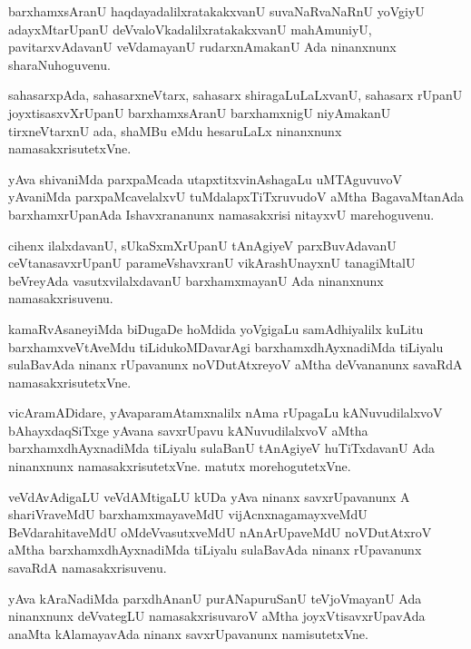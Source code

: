 \documentclass{article}
\begin{document}
\begin{mn}
barxhamxsAranU haqdayadalilxratakakxvanU suvaNaRvaNaRnU yoVgiyU adayxMtarUpanU 
deVvaloVkadalilxratakakxvanU mahAmuniyU, pavitarxvAdavanU veVdamayanU rudarxnAmakanU Ada 
ninanxnunx sharaNuhoguvenu.
\end{mn}

\begin{mn}
sahasarxpAda, sahasarxneVtarx, sahasarx shiragaLuLaLxvanU, sahasarx rUpanU joyxtisasxvXrUpanU 
barxhamxsAranU barxhamxnigU niyAmakanU tirxneVtarxnU ada, shaMBu eMdu hesaruLaLx ninanxnunx 
namasakxrisutetxVne. 
\end{mn}

\begin{mn}
yAva shivaniMda parxpaMcada utapxtitxvinAshagaLu uMTAguvuvoV yAvaniMda parxpaMcavelalxvU 
tuMdalapxTiTxruvudoV aMtha BagavaMtanAda barxhamxrUpanAda Ishavxrananunx namasakxrisi nitayxvU 
marehoguvenu.
\end{mn}

\begin{mn}
cihenx ilalxdavanU, sUkaSxmXrUpanU tAnAgiyeV parxBuvAdavanU ceVtanasavxrUpanU parameVshavxranU 
vikArashUnayxnU tanagiMtalU beVreyAda vasutxvilalxdavanU barxhamxmayanU Ada ninanxnunx 
namasakxrisuvenu.
\end{mn}

\begin{mn}
kamaRvAsaneyiMda biDugaDe hoMdida yoVgigaLu samAdhiyalilx kuLitu barxhamxveVtAveMdu 
tiLidukoMDavarAgi  barxhamxdhAyxnadiMda tiLiyalu sulaBavAda ninanx rUpavanunx noVDutAtxreyoV 
aMtha deVvananunx savaRdA namasakxrisutetxVne.
\end{mn}

\begin{mn}
vicAramADidare, yAvaparamAtamxnalilx nAma rUpagaLu kANuvudilalxvoV bAhayxdaqSiTxge yAvana 
savxrUpavu kANuvudilalxvoV aMtha barxhamxdhAyxnadiMda tiLiyalu sulaBanU tAnAgiyeV  huTiTxdavanU 
Ada ninanxnunx namasakxrisutetxVne. matutx morehogutetxVne. 
\end{mn}

\begin{mn}
veVdAvAdigaLU veVdAMtigaLU kUDa yAva ninanx savxrUpavanunx A shariVraveMdU barxhamxmayaveMdU 
vijAcnxnagamayxveMdU BeVdarahitaveMdU oMdeVvasutxveMdU nAnArUpaveMdU noVDutAtxroV aMtha 
barxhamxdhAyxnadiMda tiLiyalu sulaBavAda ninanx rUpavanunx savaRdA namasakxrisuvenu.
\end{mn}

\begin{mn}
yAva kAraNadiMda parxdhAnanU purANapuruSanU teVjoVmayanU Ada ninanxnunx deVvategLU 
namasakxrisuvaroV aMtha joyxVtisavxrUpavAda anaMta kAlamayavAda ninanx savxrUpavanunx namisutetxVne.
\end{mn}
\end{document}
